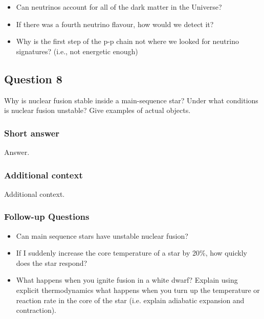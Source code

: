 \documentclass[a4paper,10pt]{article}
\begin{document}
\begin{itemize}
    \item Can neutrinos account for all of the dark matter in the Universe?
    \item If there was a fourth neutrino flavour, how would we detect it?
    \item Why is the first step of the p-p chain not where we looked for neutrino signatures? (i.e., not energetic enough)
\end{itemize}


\newpage
\subsection{Question 8}

Why is nuclear fusion stable inside a main-sequence star? Under what conditions is nuclear fusion unstable? Give examples of actual objects.

\subsubsection{Short answer}

Answer.

\subsubsection{Additional context}

Additional context.

\subsubsection{Follow-up Questions}

\begin{itemize}
    \item Can main sequence stars have unstable nuclear fusion?
    \item If I suddenly increase the core temperature of a star by 20\%, how quickly does the star respond?
    \item What happens when you ignite fusion in a white dwarf? Explain using explicit thermodynamics what happens when you turn up the temperature or reaction rate in the core of the star (i.e. explain adiabatic expansion and contraction).
\end{itemize}
\end{document}
